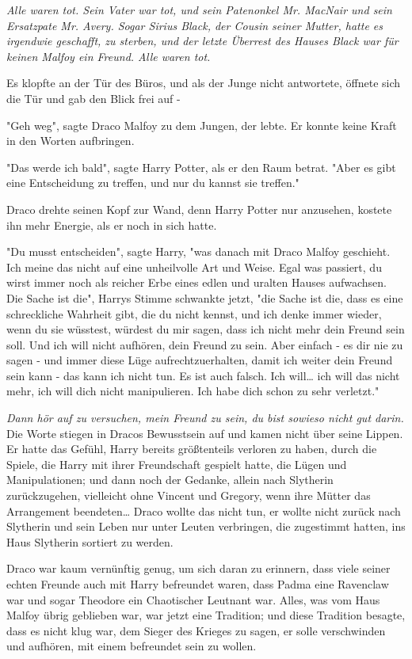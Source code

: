 {\emph{Alle waren tot. Sein Vater war tot, und sein Patenonkel Mr. MacNair und sein Ersatzpate Mr. Avery. Sogar Sirius Black, der Cousin seiner Mutter, hatte es irgendwie geschafft, zu sterben, und der letzte Überrest des Hauses Black war für keinen Malfoy ein Freund. Alle waren tot.}

Es klopfte an der Tür des Büros, und als der Junge nicht antwortete, öffnete sich die Tür und gab den Blick frei auf -

"Geh weg", sagte Draco Malfoy zu dem Jungen, der lebte. Er konnte keine Kraft in den Worten aufbringen.

"Das werde ich bald", sagte Harry Potter, als er den Raum betrat. "Aber es gibt eine Entscheidung zu treffen, und nur du kannst sie treffen."

Draco drehte seinen Kopf zur Wand, denn Harry Potter nur anzusehen, kostete ihn mehr Energie, als er noch in sich hatte.

"Du musst entscheiden", sagte Harry, "was danach mit Draco Malfoy geschieht. Ich meine das nicht auf eine unheilvolle Art und Weise. Egal was passiert, du wirst immer noch als reicher Erbe eines edlen und uralten Hauses aufwachsen. Die Sache ist die", Harrys Stimme schwankte jetzt, "die Sache ist die, dass es eine schreckliche Wahrheit gibt, die du nicht kennst, und ich denke immer wieder, wenn du sie wüsstest, würdest du mir sagen, dass ich nicht mehr dein Freund sein soll. Und ich will nicht aufhören, dein Freund zu sein. Aber einfach - es dir nie zu sagen - und immer diese Lüge aufrechtzuerhalten, damit ich weiter dein Freund sein kann - das kann ich nicht tun. Es ist auch falsch. Ich will… ich will das nicht mehr, ich will dich nicht manipulieren. Ich habe dich schon zu sehr verletzt."

\emph{Dann hör auf zu versuchen, mein Freund zu sein, du bist sowieso nicht gut darin.}\\ Die Worte stiegen in Dracos Bewusstsein auf und kamen nicht über seine Lippen. Er hatte das Gefühl, Harry bereits größtenteils verloren zu haben, durch die Spiele, die Harry mit ihrer Freundschaft gespielt hatte, die Lügen und Manipulationen; und dann noch der Gedanke, allein nach Slytherin zurückzugehen, vielleicht ohne Vincent und Gregory, wenn ihre Mütter das Arrangement beendeten… Draco wollte das nicht tun, er wollte nicht zurück nach Slytherin und sein Leben nur unter Leuten verbringen, die zugestimmt hatten, ins Haus Slytherin sortiert zu werden.

Draco war kaum vernünftig genug, um sich daran zu erinnern, dass viele seiner echten Freunde auch mit Harry befreundet waren, dass Padma eine Ravenclaw war und sogar Theodore ein Chaotischer Leutnant war. Alles, was vom Haus Malfoy übrig geblieben war, war jetzt eine Tradition; und diese Tradition besagte, dass es nicht klug war, dem Sieger des Krieges zu sagen, er solle verschwinden und aufhören, mit einem befreundet sein zu wollen.

}
